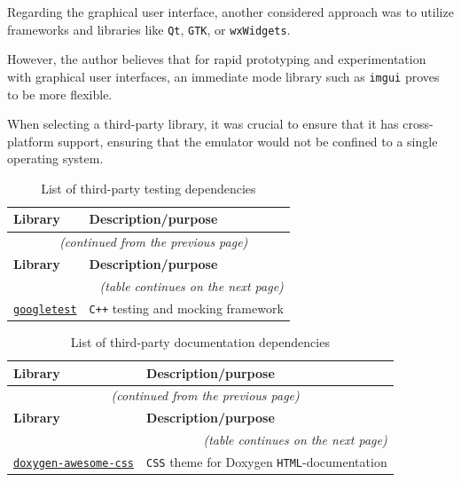 \documentclass[english, ing, kiv, he, iso690numb, pdf]{fasthesis}
\begin{document}
	Regarding the graphical user interface, another considered approach was to utilize frameworks and libraries like \texttt{Qt}, \texttt{GTK}, or \texttt{wxWidgets}.
	
	However, the author believes that for rapid prototyping and experimentation with graphical user interfaces, an immediate mode library such as \texttt{imgui} proves to be more flexible.
	
	\begin{important}
		When selecting a third-party library, it was crucial to ensure that it has cross-platform support, ensuring that the emulator would not be confined to a single operating system.
	\end{important}
	
	\begin{center}
		\begin{longtable}{p{}p{}}
			\caption{List of third-party testing dependencies}
			\label{List of third-party testing dependencies}\\
			\toprule[1.5pt]
			\textbf{Library} & \textbf{Description/purpose}\\
			\midrule
			\endfirsthead
			\multicolumn{2}{c}{\tablename{}~\thetable{} \textit{(continued from the previous page)}}\\
			\midrule
			\textbf{Library} & \textbf{Description/purpose}\\
			\midrule
			\endhead
			\midrule
			\multicolumn{2}{r}{\textit{(table continues on the next page)}}\\
			\endfoot
			\bottomrule[1.5pt]
			\endlastfoot
			\href{https://github.com/google/googletest/tree/750d67d809700ae8fca6d610f7b41b71aa161808}{\texttt{googletest}} & \texttt{C++} testing and mocking framework\\
		\end{longtable}
	\end{center}
	
	\begin{center}
		\begin{longtable}{p{}p{}}
			\caption{List of third-party documentation dependencies}
			\label{List of third-party documentation dependencies}\\
			\toprule[1.5pt]
			\textbf{Library} & \textbf{Description/purpose}\\
			\midrule
			\endfirsthead
			\multicolumn{2}{c}{\tablename{}~\thetable{} \textit{(continued from the previous page)}}\\
			\midrule
			\textbf{Library} & \textbf{Description/purpose}\\
			\midrule
			\endhead
			\midrule
			\multicolumn{2}{r}{\textit{(table continues on the next page)}}\\
			\endfoot
			\bottomrule[1.5pt]
			\endlastfoot
			\href{https://github.com/jothepro/doxygen-awesome-css/tree/245c7c94c20eac22730ef89035967f78b77bf405}{\texttt{doxygen-awesome-css}} & \texttt{CSS} theme for Doxygen \texttt{HTML}-documentation\\
		\end{longtable}
	\end{center}
	
\end{document}
